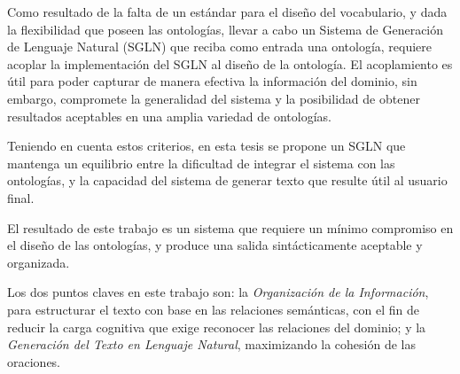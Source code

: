
Como resultado de la falta de un estándar para el diseño del vocabulario, y dada la flexibilidad que poseen las ontologías, llevar a cabo un Sistema de Generación de Lenguaje Natural (SGLN) que reciba como entrada una ontología, requiere acoplar la implementación del SGLN al diseño de la ontología. El acoplamiento es útil para poder capturar de manera efectiva la información del dominio, sin embargo, compromete la generalidad del sistema y la posibilidad de obtener resultados aceptables en una amplia variedad de ontologías.

Teniendo en cuenta estos criterios, en esta tesis se propone un SGLN que mantenga un equilibrio entre la dificultad de integrar el sistema con las ontologías, y la capacidad del sistema de generar texto que resulte útil al usuario final. 

El resultado de este trabajo es un sistema que requiere un mínimo compromiso en el diseño de las ontologías, y produce una salida sintácticamente aceptable y organizada.

Los dos puntos claves en este trabajo son: la \textit{Organización de la Información}, para estructurar el texto con base en las relaciones semánticas, con el fin de reducir la carga cognitiva que exige reconocer las relaciones del dominio; y la \textit{Generación del Texto en Lenguaje Natural}, maximizando la cohesión de las oraciones.

\vfill
\pagebreak

